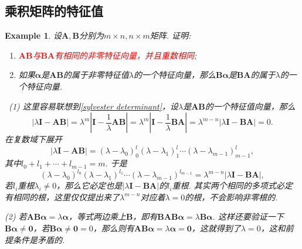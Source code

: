 \documentclass{article}
\newtheorem{example}[theorem]{Example}
\newcommand{\hints}{{\color{blue} \text{hints}}}
\newcommand{\mbf}[1]{\bm{#1}}
\newcommand{\redt}[1]{\textcolor{red}{#1}}
\begin{document}
\subsection{乘积矩阵的特征值}

\begin{example}\label{eigenvalue-of-AB-and-BA}
\rm 设$\mbf{A},\mbf{B}$分别为$m \times n, n \times m$矩阵. 证明:
\begin{enumerate}
	\item \redt{$\mbf{AB}$与$\mbf{BA}$有相同的非零特征向量，并且重数相同};
	\item 如果$\mbf{\alpha}$是$\mbf{AB}$的属于非零特征值$\lambda$的一个特征向量，那么$\mbf{B\alpha}$是$\mbf{BA}$的属于$\lambda$的一个特征向量. 
\end{enumerate}

\hints\ (1) 这里容易联想到\ref{sylvester determinant}，设$\lambda$是$\mbf{AB}$的一个特征值向量，那么
$$
|\lambda\mbf{I} - \mbf{AB}| = \lambda^m|\mbf{I}-\frac{1}{\lambda}\mbf{AB}| = \lambda^m |\mbf{I} - \frac{1}{\lambda}\mbf{BA}| = \lambda^{m-n}|\lambda\mbf{I} - \mbf{BA}| = 0. 
$$
在复数域下展开
$$
|\lambda\mbf{I} - \mbf{AB}| = (\lambda- \lambda_0)^l_0(\lambda- \lambda_1)^l_1\cdots(\lambda- \lambda_{m-1})^l_{m-1}, 
$$
其中$l_0 + l_1 + \cdots + l_{m-1} = m$. 于是
$$
(\lambda- \lambda_0)^{l_0}(\lambda- \lambda_1)^{l_1}\cdots(\lambda- \lambda_{m-1})^{l_{m-1}} = \lambda^{m-n}|\lambda\mbf{I} - \mbf{BA}|,
$$
若$l_i$重根$\lambda_i \neq 0$，那么它必定也是$|\lambda\mbf{I}-\mbf{BA}|$的$l_i$重根. 其实两个相同的多项式必定有相同的根，这里仅仅提出来了$\lambda^{m-n}$对应着$\lambda = 0$的根，不会影响非零根的. 

(2) 若$\mbf{AB\alpha} = \lambda\mbf{\alpha}$，等式两边乘上$\mbf{B}$，即有$\mbf{BAB\alpha} = \lambda\mbf{B\alpha}$. 这样还要验证一下$\mbf{B}\mbf{\alpha} \neq  \mbf{0}$，若$\mbf{B}\mbf{\alpha} \neq  \mbf{0} = 0$，那么则有$\mbf{AB\alpha} = \lambda\mbf{\alpha} = \mbf{0}$，这就得到了$\lambda = 0$，这和前提条件是矛盾的. 
\end{example}
\end{document}
